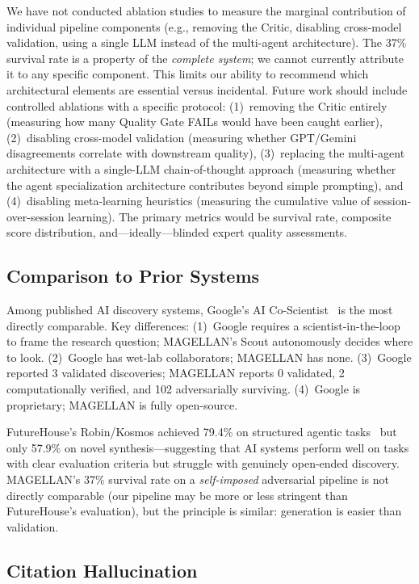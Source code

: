 We have not conducted ablation studies to measure the marginal contribution of individual pipeline components (e.g., removing the Critic, disabling cross-model validation, using a single LLM instead of the multi-agent architecture). The 37\% survival rate is a property of the \emph{complete system}; we cannot currently attribute it to any specific component. This limits our ability to recommend which architectural elements are essential versus incidental. Future work should include controlled ablations with a specific protocol: (1)~removing the Critic entirely (measuring how many Quality Gate FAILs would have been caught earlier), (2)~disabling cross-model validation (measuring whether GPT/Gemini disagreements correlate with downstream quality), (3)~replacing the multi-agent architecture with a single-LLM chain-of-thought approach (measuring whether the agent specialization architecture contributes beyond simple prompting), and (4)~disabling meta-learning heuristics (measuring the cumulative value of session-over-session learning). The primary metrics would be survival rate, composite score distribution, and---ideally---blinded expert quality assessments.

\subsection{Comparison to Prior Systems}

Among published AI discovery systems, Google's AI Co-Scientist~\citep{gottweis2025} is the most directly comparable. Key differences: (1)~Google requires a scientist-in-the-loop to frame the research question; MAGELLAN's Scout autonomously decides where to look. (2)~Google has wet-lab collaborators; MAGELLAN has none. (3)~Google reported 3 validated discoveries; MAGELLAN reports 0 validated, 2 computationally verified, and 102 adversarially surviving. (4)~Google is proprietary; MAGELLAN is fully open-source.

FutureHouse's Robin/Kosmos achieved 79.4\% on structured agentic tasks~\citep{mitchener2025} but only 57.9\% on novel synthesis---suggesting that AI systems perform well on tasks with clear evaluation criteria but struggle with genuinely open-ended discovery. MAGELLAN's 37\% survival rate on a \emph{self-imposed} adversarial pipeline is not directly comparable (our pipeline may be more or less stringent than FutureHouse's evaluation), but the principle is similar: generation is easier than validation.

\subsection{Citation Hallucination}

